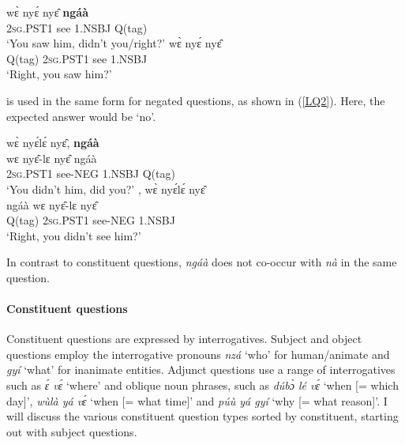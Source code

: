 \begin{exe}
\ex\label{LQ1}
\begin{xlist}
\ex \label{LQ1a}
  \gll     wɛ̀ nyɛ́ nyɛ̂ {\bfseries ngáà} \\
               2\textsc{sg}.PST1 see 1.NSBJ  Q(tag)\\
    \trans `You saw him, didn't you/right?'
\ex\label{LQ1b}
  wɛ̀ nyɛ́ nyɛ̂  \\
             Q(tag) 2\textsc{sg}.PST1 see 1.NSBJ   \\
    \trans `Right, you saw him?'
\end {xlist}
\end {exe}

 is used in the same form for negated questions, as shown in (\ref{LQ2}). Here, the expected answer would be `no'.

\begin{exe}
\ex\label{LQ2}
\begin{xlist}
\ex \label{LQ2a}
  \glll     wɛ̀ nyɛ́lɛ́ nyɛ̂, {\bfseries ngáà} \\
              wɛ nyɛ̂-lɛ nyɛ̂ ngáà \\
               2\textsc{sg}.PST1 see-NEG 1.NSBJ Q(tag) \\
    \trans `You didn't him, did you?'
\ex\label{LQ2b}
 , wɛ̀ nyɛ́lɛ́ nyɛ̂  \\
          ngáà wɛ nyɛ̂-lɛ nyɛ̂ \\
             Q(tag) 2\textsc{sg}.PST1 see-NEG 1.NSBJ  \\
    \trans `Right, you didn't see him?'
\end {xlist}
\end {exe}


\noindent  In contrast to constituent questions, {\itshape ngáà} does not co-occur with {\itshape nà} in the same question. 







\paragraph{Constituent questions}
Constituent questions are expressed by interrogatives. Subject and object questions employ the interrogative pronouns {\itshape nzá} `who' for human/animate and {\itshape gyí} `what' for inanimate entities. Adjunct questions use a range of interrogatives such as {\itshape ɛ́ vɛ́} `where' and oblique noun phrases, such as {\itshape dúbɔ̀ lé vɛ́} `when [= which day]', {\itshape wùlà yá vɛ́} `when [= what time]' and {\itshape púù yá gyí} `why [= what reason]'. I will discuss the various constituent question types sorted by constituent, starting out with subject questions. 


